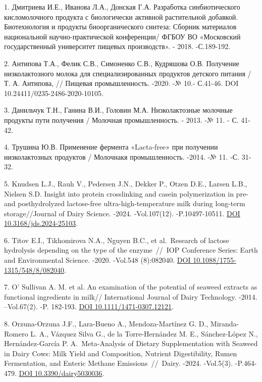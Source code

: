\begin{refs}
1. Дмитриева И.Е., Иванова Л.А., Донская Г.А. Разработка синбиотического
кисломолочного продукта с биологически активной растительной добавкой.
Биотехнология и продукты биоорганического синтеза: Сборник материалов
национальной научно-практической конференции/ ФГБОУ ВО «Московский
государственный университет пищевых производств». - 2018. -С.189-192.

2. Антипова Т.А., Фелик С.В., Симоненко С.В., Кудряшова О.В. Получение
низколактозного молока для специализированных продуктов детского питания
/ Т. А. Антипова, // Пищевая промышленность. -2020. -№ 10.- С.41-46.
DOI 10.24411/0235-2486-2020-10105.

3. Данильчук Т.Н., Ганина В.И., Головин М.А. Низколактозные молочные
продукты пути получения / Молочная промышленность. - 2013. -№ 11. - С.
41-42.

4. Трушина Ю.В. Применение фермента «Lacta-free» при получении
низколактозных продуктов / Молочнакя промышленность. -2014. -№ 11. -С.
31-32.

5. Knudsen L.J., Rauh V., Pedersen J.N., Dekker P., Otzen D.E., Larsen
L.B., Nielsen S.D. Insight into protein crosslinking and casein
polymerization in pre- and posthydrolyzed lactose-free
ultra-high-temperature milk during long-term storage//Journal of Dairy
Science. -2024. -Vol.107(12). -P.10497-10511.
\href{https://doi.org/10.3168/jds.2024-25103}{DOI
10.3168/jds.2024-25103}.

6. Titov E.I., Tikhomirova N.A., Nguyen B.C., et al.~Research of lactose
hydrolysis depending on the type of the enzyme~//~IOP Conference Series:
Earth and Environmental Science. -2020. -Vol.548 (8):082040.
\href{https://doi.org/0.1088/1755-1315/548/8/082040}{DOI
10.1088/1755-1315/548/8/082040}.

7. O' Sullivan A. M. et al. An examination of the
potential of seaweed extracts as functional ingredients in milk//
International Journal of Dairy Technology. -2014. --Vol.67(2). -P.
182-193. \href{https://doi.org/10.1111/1471-0307.12121}{DOI
10.1111/1471-0307.12121}.

8. Orzuna-Orzuna J.F., Lara-Bueno A., Mendoza-Martínez G. D.,
Miranda-Romero L. A., Vázquez Silva G., de la Torre-Hernández M. E.,
Sánchez-López N., Hernández-García P. A.~Meta-Analysis of Dietary
Supplementation with Seaweed in Dairy Cows: Milk Yield and Composition,
Nutrient Digestibility, Rumen Fermentation, and Enteric Methane
Emissions~//~Dairy. -2024. -Vol.5(3). -P.464-479.
\href{https://doi.org/10.3390/dairy5030036}{DOI 10.3390/dairy5030036}.


\end{refs}
